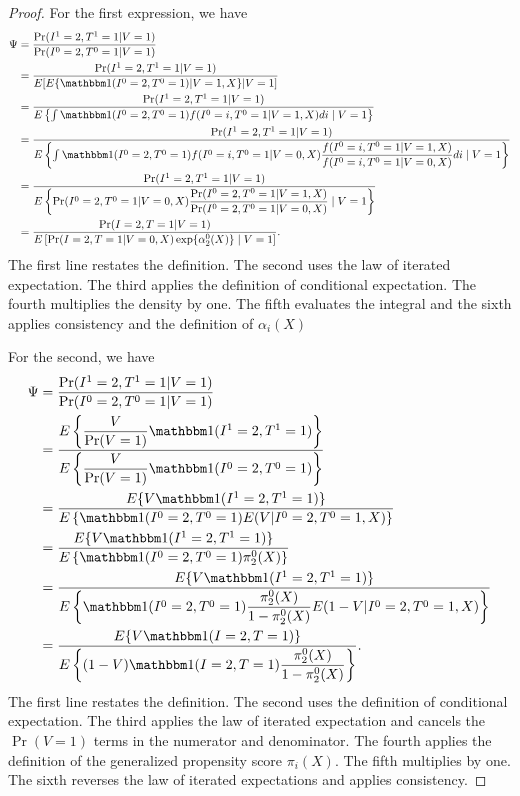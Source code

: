 \begin{appendix}
\begin{proof}
    For the first expression, we have 
    \begin{align*}
        \Psi &= \dfrac{\Pr(I^1=2, T^1=1|V=1)}{\Pr(I^0=2, T^0=1|V=1)} \\
        &= \dfrac{\Pr(I^1=2,T^1=1|V=1)}{E[E\{\mathbbm 1 (I^0 = 2, T^0=1) | V = 1, X\} | V = 1]} \\
        &= \dfrac{\Pr(I^1=2,T^1=1|V=1)}{E\left\{\int \mathbbm 1 (I^0 = 2, T^0=1) f(I^0 = i, T^0=1 | V = 1, X) di \mid  V = 1\right\}} \\
        &= \dfrac{\Pr(I^1=2,T^1=1|V=1)}{E\left\{\int \mathbbm 1 (I^0 = 2, T^0=1) f(I^0 = i, T^0=1 | V = 0, X) \dfrac{f(I^0 = i,T^0=1 | V = 1, X)}{f(I^0 = i, T^0=1| V = 0, X)}di \mid  V = 1\right\}} \\
        &= \dfrac{\Pr(I^1=2,T^1=1|V=1)}{E\left\{ \Pr(I^0 = 2, T^0=1 | V = 0, X) \dfrac{\Pr(I^0 = 2, T^0=1 | V = 1, X)}{\Pr(I^0 = 2, T^0=1 | V = 0, X)} \mid  V = 1\right\}} \\
        &= \dfrac{\Pr(I=2,T=1|V=1)}{E\left[ \Pr(I = 2, T=1 | V = 0, X) \exp\{\alpha^0_2(X)\} \mid  V = 1\right]}.
    \end{align*}
    The first line restates the definition. The second uses the law of iterated expectation. The third applies the definition of conditional expectation. The fourth multiplies the density by one. The fifth evaluates the integral and the sixth applies consistency and the definition of $\alpha_i(X)$
    
    For the second, we have 
    \begin{align*}
        \Psi &= \dfrac{\Pr(I^1=2, T^1=1|V=1)}{\Pr(I^0=2, T^0=1|V=1)} \\
        &= \dfrac{E\left\{\dfrac{V}{\Pr(V = 1)} \mathbbm 1 (I^1 = 2, T^1=1)\right\}}{E\left\{\dfrac{V}{\Pr(V=1)}\mathbbm 1 (I^0 = 2,T^0=1)\right\}} \\
        &= \dfrac{E\{V \mathbbm 1 (I^1 = 2, T^1=1)\}}{E\left\{\mathbbm 1 (I^0 = 2, T^0=1) E(V | I^0 = 2, T^0=1, X)\right\}} \\
        &= \dfrac{E\{V \mathbbm 1 (I^1 = 2, T^1=1)\}}{E\left\{\mathbbm 1 (I^0 = 2, T^0=1) \pi^0_2(X)\right\}} \\
        &= \dfrac{E\{V \mathbbm 1 (I^1 = 2, T^1=1)\}}{E\left\{\mathbbm 1 (I^0 = 2, T^0=1) \dfrac{\pi^0_2(X)}{1-\pi^0_2(X)}E(1-V|I^0 = 2, T^0=1, X)\right\}} \\
        &= \dfrac{E\{V \mathbbm 1 (I = 2, T=1)\}}{E\left\{(1 - V)\mathbbm 1 (I = 2, T=1) \dfrac{\pi^0_2(X)}{1-\pi^0_2(X)}\right\}}.
    \end{align*}
    The first line restates the definition. The second uses the definition of conditional expectation. The third applies the law of iterated expectation and cancels the $\Pr(V=1)$ terms in the numerator and denominator. The fourth applies the definition of the generalized propensity score $\pi_i(X)$. The fifth multiplies by one. The sixth reverses the law of iterated expectations and applies consistency. 


\end{proof}
\end{appendix}
